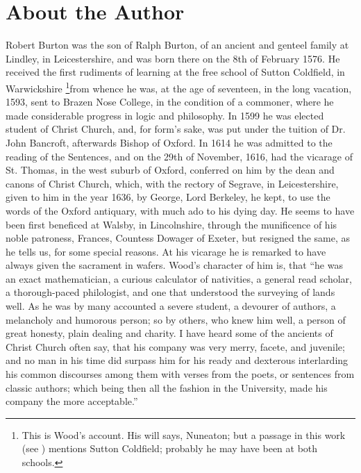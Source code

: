 \documentclass[titlepage,12pt,a4]{octavo}
\begin{document}
\chapter{About the Author}
Robert Burton was the son of Ralph Burton, of an ancient and genteel family at Lindley, in Leicestershire, and was born there on the 8th of February 1576.
He received the first rudiments of learning at the free school of Sutton Coldfield, in Warwickshire \footnote{This is Wood's account.
His will says, Nuneaton; but a passage in this work (see ) mentions Sutton Coldfield; probably he may have been at both schools.}from whence he was, at the age of seventeen, in the long vacation, 1593, sent to Brazen Nose College, in the condition of a commoner, where he made considerable progress in logic and philosophy.
In 1599 he was elected student of Christ Church, and, for form's sake, was put under the tuition of Dr. John Bancroft, afterwards Bishop of Oxford.
In 1614 he was admitted to the reading of the Sentences, and on the 29th of November, 1616, had the vicarage of St. Thomas, in the west suburb of Oxford, conferred on him by the dean and canons of Christ Church, which, with the rectory of Segrave, in Leicestershire, given to him in the year 1636, by George, Lord Berkeley, he kept, to use the words of the Oxford antiquary, with much ado to his dying day.
He seems to have been first beneficed at Walsby, in Lincolnshire, through the munificence of his noble patroness, Frances, Countess Dowager of Exeter, but resigned the same, as he tells us, for some special reasons.
At his vicarage he is remarked to have always given the sacrament in wafers.
Wood's character of him is, that “he was an exact mathematician, a curious calculator of nativities, a general read scholar, a thorough-paced philologist, and one that understood the surveying of lands well.
As he was by many accounted a severe student, a devourer of authors, a melancholy and humorous person; so by others, who knew him well, a person of great honesty, plain dealing and charity.
I have heard some of the ancients of Christ Church often say, that his company was very merry, facete, and juvenile; and no man in his time did surpass him for his ready and dexterous interlarding his common discourses among them with verses from the poets, or sentences from classic authors; which being then all the fashion in the University, made his company the more acceptable.”
\end{document}
